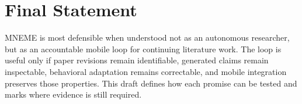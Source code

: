 \section{Final Statement}

MNEME is most defensible when understood not as an autonomous researcher, but as an accountable mobile loop for continuing literature work.
The loop is useful only if paper revisions remain identifiable, generated claims remain inspectable, behavioral adaptation remains correctable, and mobile integration preserves those properties.
This draft defines how each promise can be tested and marks where evidence is still required.

\clearpage
